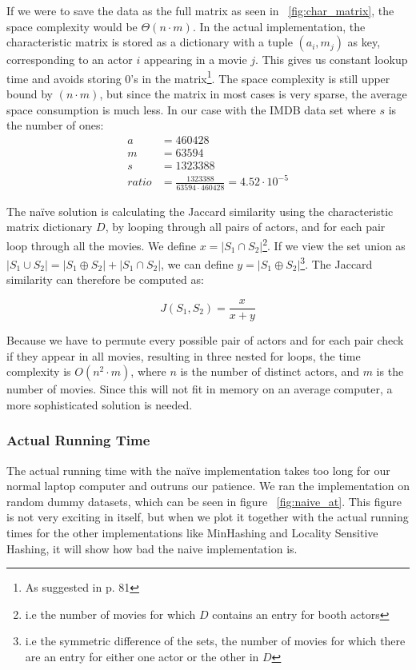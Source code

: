\documentclass[a4paper,11pt]{article}
\begin{document}
If we were to save the data as the full matrix as seen in ~\ref{fig:char_matrix}, the space complexity would be $\Theta (n \cdot m)$. In the actual implementation,  the characteristic matrix is stored as a dictionary with a tuple $(a_i,m_j)$ as key, corresponding to an actor $i$ appearing in a movie $j$. This gives us constant lookup time and avoids storing 0's in the matrix\footnote{As suggested in \cite{book:mmds} p. 81}. The space complexity is still upper bound by $(n \cdot m)$, but since the matrix in most cases is very sparse, the average space consumption is much less. In our case with the IMDB data set where $s$ is the number of ones:
\begin{equation}
\begin{aligned}
a &= 460428\\
m &= 63594\\
s &= 1323388\\
ratio &= \frac{1323388}{63594 \cdot 460428} = 4.52\cdot 10^{-5}
\end{aligned}
\end{equation}

The naïve solution  is calculating the Jaccard similarity using the characteristic matrix dictionary $D$, by looping through all pairs of actors, and for each pair loop through all the movies. We define $x = |S_1 \cap S_2|$\footnote{i.e the number of movies for which $D$ contains an entry for booth actors}. If we view the set union as $|S_1 \cup S_2| = |S_1 \oplus S_2| + |S_1 \cap S_2|$, we can define $y = |S_1 \oplus S_2|$\footnote{i.e the symmetric difference of the sets, the number of movies for which there are an entry for either one actor or the other in $D$}. The Jaccard similarity can therefore be computed as:

\begin{equation}
J(S_1,S_2) = \frac{x}{x+y}
\end{equation}

Because we have to permute every possible pair of actors and for each pair check if they appear in all movies, resulting in three nested for loops, the time complexity is $O(n^2 \cdot m)$, where $n$ is the number of distinct actors, and $m$ is the number of movies. Since this will not fit in memory on an average computer, a more sophisticated solution is needed. \\

\subsubsection{Actual Running Time}
The actual running time with the naïve implementation takes too long for our normal laptop computer and outruns our patience. We ran the implementation on random dummy datasets, which can be seen in figure ~\ref{fig:naive_at}. This figure is not very exciting in itself, but when we plot it together with the actual running times for the other implementations like MinHashing and Locality Sensitive Hashing, it will show how bad the naive implementation is. \\
\end{document}
